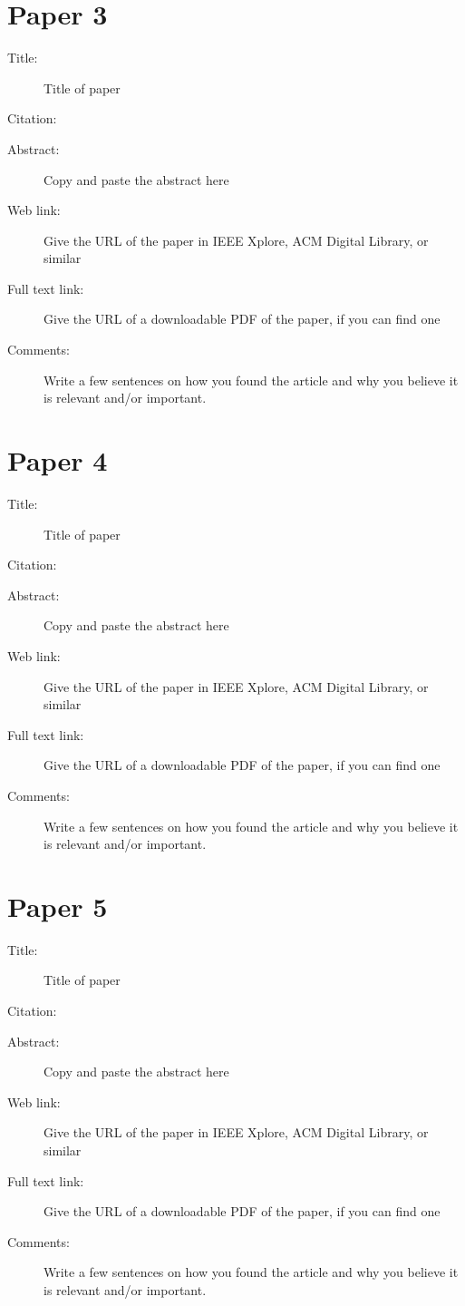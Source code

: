 \documentclass{scrartcl}
\begin{document}
\section*{Paper 3}
\begin{description}
\item[Title:] Title of paper
\item[Citation:] \cite{bibtex_key}
\item[Abstract:] Copy and paste the abstract here
\item[Web link:] Give the URL of the paper in IEEE Xplore, ACM Digital Library, or similar
\item[Full text link:] Give the URL of a downloadable PDF of the paper, if you can find one
\item[Comments:] Write a few sentences on how you found the article and why you believe it is relevant and/or important.
\end{description}

\section*{Paper 4}
\begin{description}
\item[Title:] Title of paper
\item[Citation:] \cite{bibtex_key}
\item[Abstract:] Copy and paste the abstract here
\item[Web link:] Give the URL of the paper in IEEE Xplore, ACM Digital Library, or similar
\item[Full text link:] Give the URL of a downloadable PDF of the paper, if you can find one
\item[Comments:] Write a few sentences on how you found the article and why you believe it is relevant and/or important.
\end{description}

\section*{Paper 5}
\begin{description}
\item[Title:] Title of paper
\item[Citation:] \cite{bibtex_key}
\item[Abstract:] Copy and paste the abstract here
\item[Web link:] Give the URL of the paper in IEEE Xplore, ACM Digital Library, or similar
\item[Full text link:] Give the URL of a downloadable PDF of the paper, if you can find one
\item[Comments:] Write a few sentences on how you found the article and why you believe it is relevant and/or important.
\end{description}



\end{document}
